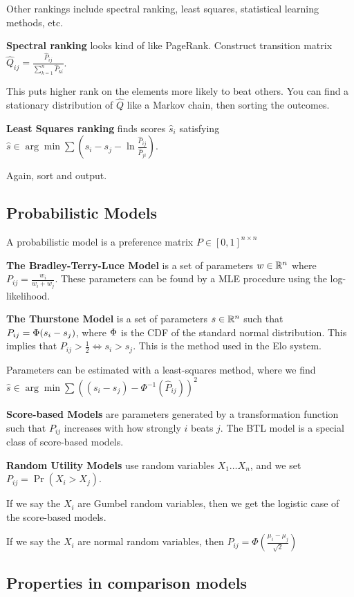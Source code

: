 \documentclass[twoside]{article}
\begin{document}
Other rankings include spectral ranking, least squares, statistical learning methods, etc.

\textbf{Spectral ranking} looks kind of like PageRank.  Construct transition matrix $\hat{Q}_{ij} = \frac{\hat{P}_{ij}}{\sum\limits_{k=1}^n\hat{P}_{ki}}$.

This puts higher rank on the elements more likely to beat others.  You can find a stationary distribution of $\hat{Q}$ like a Markov chain, then sorting the outcomes.

\textbf{Least Squares ranking} finds scores $\hat{s}_i$ satisfying $\hat{s} \in \arg\min \sum(s_i - s_j -\ln{\frac{\hat{P}_{ij}}{\hat{P}_{ji}}})$.

Again, sort and output.


\subsection*{Probabilistic Models}


A probabilistic model is a preference matrix $P \in [0,1]^{n\times n}$


\textbf{The Bradley-Terry-Luce Model} is a set of parameters $\boldmath{w}\in\mathbb{R}^n$ where $P_{ij} = \frac{w_i}{w_i + w_j}$.  These parameters can be found by a MLE procedure using the log-likelihood.


\textbf{The Thurstone Model} is a set of parameters $\boldmath{s} \in \mathbb{R}^n$ such that $P_{ij} = \boldmath{\Phi}(s_i - s_j)$, where $\boldmath{\Phi}$ is the CDF of the standard normal distribution.  This implies that $P_{ij} > \frac{1}{2} \iff s_i > s_j$.  This is the method used in the Elo system.

Parameters can be estimated with a least-squares method, where we find $\hat{s} \in \arg\min \sum ((s_i-s_j)-\Phi^{-1}(\hat{P}_{ij}))^2$

\textbf{Score-based Models} are parameters generated by a transformation function such that $P_{ij}$ increases with how strongly $i$ beats $j$. The BTL model is a special class of score-based models.

\textbf{Random Utility Models} use random variables $X_1\dots X_n$, and we set $P_{ij} = \Pr(X_i > X_j)$.  

If we say the $X_i$ are Gumbel random variables, then we get the logistic case of the score-based models.

If we say the $X_i$ are normal random variables, then $P_{ij} = \Phi (\frac{\mu_i - \mu_j}{\sqrt{2}})$


\subsection*{Properties in comparison models}
\end{document}
